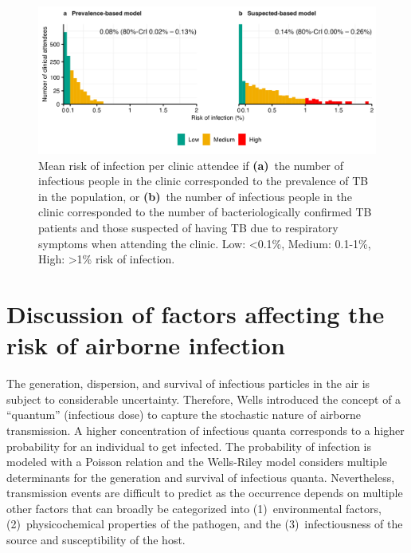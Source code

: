 \documentclass[fleqn,11pt]{wlscirep_supp}
\begin{document}
\begin{figure}[!htpb]
    \centering
    \includegraphics{results/modeling/mean-roi-assumptions.png}
    \caption[Mean risk of infection per clinic attendee when varying assumptions about the number of infectious people in the clinic]{Mean risk of infection per clinic attendee if \textbf{(a)}~the number of infectious people in the clinic corresponded to the prevalence of TB in the population, or \textbf{(b)}~the number of infectious people in the clinic corresponded to the number of bacteriologically confirmed TB patients and those suspected of having TB due to respiratory symptoms when attending the clinic. Low: <0.1\%, Medium: 0.1-1\%, High: >1\% risk of infection.}
    \label{fig:assumptions-results}
\end{figure}

\clearpage

\section{Discussion of factors affecting the risk of airborne infection}\label{sec:depth-discussion}


The generation, dispersion, and survival of infectious particles in the air is subject to considerable uncertainty. Therefore, Wells\cite{Wells1955} introduced the concept of a ``quantum'' (infectious dose) to capture the stochastic nature of airborne transmission. A higher concentration of infectious quanta corresponds to a higher probability for an individual to get infected. The probability of infection is modeled with a Poisson relation and the Wells-Riley model considers multiple determinants for the generation and survival of infectious quanta. Nevertheless, transmission events are difficult to predict as the occurrence depends on multiple other factors that can broadly be categorized into (1)~environmental factors, (2)~physicochemical properties of the pathogen, and the (3)~infectiousness of the source and susceptibility of the host. 
\end{document}
